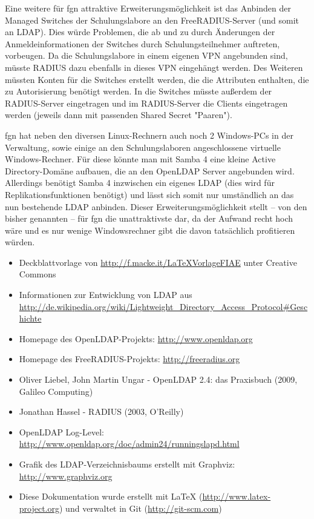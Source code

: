 \documentclass[11pt,a4paper,titlepage=firstiscover,headsepline,bibtotoc]{scrartcl} %
\newcommand{\hilight}[1]{\colorbox{yellow}{#1}} %
\begin{document}
Eine weitere für fgn attraktive Erweiterungsmöglichkeit ist das Anbinden der Managed Switches der Schulungslabore an den FreeRADIUS-Server (und somit an LDAP). Dies würde Problemen, die ab und zu durch Änderungen der Anmeldeinformationen der Switches durch Schulungsteilnehmer auftreten, vorbeugen. Da die Schulungslabore in einem eigenen VPN angebunden sind, müsste RADIUS dazu ebenfalls in dieses VPN eingehängt werden. Des Weiteren müssten Konten für die Switches erstellt werden, die die Attributen enthalten, die zu Autorisierung benötigt werden. In die Switches müsste außerdem der RADIUS-Server eingetragen und im RADIUS-Server die Clients eingetragen werden (jeweils dann mit passenden Shared Secret "Paaren").

fgn hat neben den diversen Linux-Rechnern auch noch 2 Windows-PCs in der Verwaltung, sowie einige an den Schulungslaboren angeschlossene virtuelle Windows-Rechner. Für diese könnte man mit Samba 4 eine kleine Active Directory-Domäne aufbauen, die an den OpenLDAP Server angebunden wird. Allerdings benötigt Samba 4 inzwischen ein eigenes LDAP (dies wird für Replikationsfunktionen benötigt) und lässt sich somit nur umständlich an das nun bestehende LDAP anbinden. Dieser Erweiterungsmöglichkeit stellt -- von den bisher genannten -- für fgn die unattraktivste dar, da der Aufwand recht hoch wäre und es nur wenige Windowsrechner gibt die davon tatsächlich profitieren würden.

\newpage
{}
\begin{itemize}
\item Deckblattvorlage von \url{http://f.macke.it/LaTeXVorlageFIAE} unter Creative Commons
\item Informationen zur Entwicklung von LDAP aus \url{http://de.wikipedia.org/wiki/Lightweight_Directory_Access_Protocol#Geschichte}
\item Homepage des OpenLDAP-Projekts: \url{http://www.openldap.org}
\item Homepage des FreeRADIUS-Projekts: \url{http://freeradius.org}
\item Oliver Liebel, John Martin Ungar - OpenLDAP 2.4: das Praxisbuch (2009, Galileo Computing)
\item Jonathan Hassel - RADIUS (2003, O'Reilly)
\item OpenLDAP Log-Level: \url{http://www.openldap.org/doc/admin24/runningslapd.html}
\item Grafik des LDAP-Verzeichnisbaums erstellt mit Graphviz: \url{http://www.graphviz.org}
\item Diese Dokumentation wurde erstellt mit \LaTeX{} (\url{http://www.latex-project.org}) und verwaltet in Git (\url{http://git-scm.com})
\end{itemize}
\end{document}
